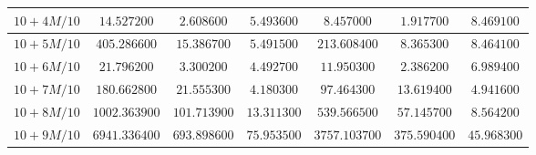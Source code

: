 \begin{landscape}
\begin{tabular}{|c|c|c|c|c|c|c|}
$10 + 4M/10$ & $14.527200$                                                  & $2.608600$                                                   & $5.493600$                                                   & $8.457000$                                                         & $1.917700$                                                         & \multicolumn{1}{c|}{$8.469100$}                                                         \\ \hline
$10 + 5M/10$ & $405.286600$                                                 & $15.386700$                                                  & $5.491500$                                                   & $213.608400$                                                       & $8.365300$                                                         & \multicolumn{1}{c|}{$8.464100$}                                                         \\ \hline
$10 + 6M/10$ & $21.796200$                                                  & $3.300200$                                                   & $4.492700$                                                   & $11.950300$                                                        & $2.386200$                                                         & \multicolumn{1}{c|}{$6.989400$}                                                         \\ \hline
$10 + 7M/10$ & $180.662800$                                                 & $21.555300$                                                  & $4.180300$                                                   & $97.464300$                                                        & $13.619400$                                                        & \multicolumn{1}{c|}{$4.941600$}                                                         \\ \hline
$10 + 8M/10$ & $1002.363900$                                                & $101.713900$                                                 & $13.311300$                                                  & $539.566500$                                                       & $57.145700$                                                        & \multicolumn{1}{c|}{$8.564200$}                                                         \\ \hline
$10 + 9M/10$ & $6941.336400$                                                & $693.898600$                                                 & $75.953500$                                                  & $3757.103700$                                                      & $375.590400$                                                       & $45.968300$                                                                             \\ \hline
\end{tabular}
\end{landscape}
